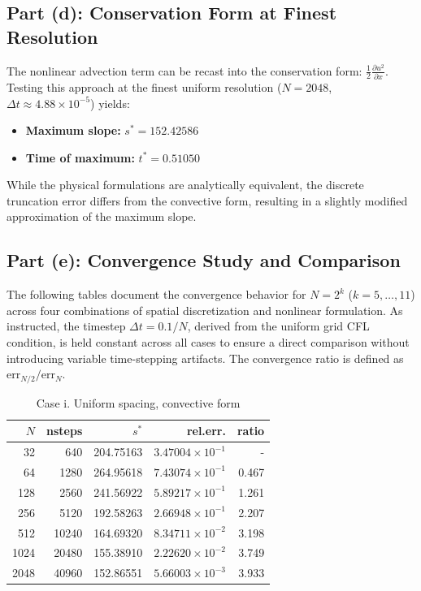 \documentclass[11pt]{article}
\begin{document}
\subsection*{Part (d): Conservation Form at Finest Resolution}
The nonlinear advection term can be recast into the conservation form: $\frac{1}{2}\frac{\partial u^2}{\partial x}$. Testing this approach at the finest uniform resolution ($N=2048$, $\Delta t \approx 4.88 \times 10^{-5}$) yields:
\begin{itemize}
    \item \textbf{Maximum slope:} $s^* = 152.42586$
    \item \textbf{Time of maximum:} $t^* = 0.51050$
\end{itemize}
While the physical formulations are analytically equivalent, the discrete truncation error differs from the convective form, resulting in a slightly modified approximation of the maximum slope.

\subsection*{Part (e): Convergence Study and Comparison}

The following tables document the convergence behavior for $N=2^k$ ($k=5, \dots, 11$) across four combinations of spatial discretization and nonlinear formulation. As instructed, the timestep $\Delta t = 0.1/N$, derived from the uniform grid CFL condition, is held constant across all cases to ensure a direct comparison without introducing variable time-stepping artifacts. The convergence ratio is defined as $\text{err}_{N/2}/\text{err}_{N}$.

\begin{table}[H]
\centering
\caption{Case i. Uniform spacing, convective form}
\begin{tabular}{@{}rrrrr@{}}
\toprule
$N$ & nsteps & $s^*$ & rel.err. & ratio \\
\midrule
  32 &   640 & 204.75163 & $3.47004 \times 10^{-1}$ & - \\
  64 &  1280 & 264.95618 & $7.43074 \times 10^{-1}$ & 0.467 \\
 128 &  2560 & 241.56922 & $5.89217 \times 10^{-1}$ & 1.261 \\
 256 &  5120 & 192.58263 & $2.66948 \times 10^{-1}$ & 2.207 \\
 512 & 10240 & 164.69320 & $8.34711 \times 10^{-2}$ & 3.198 \\
1024 & 20480 & 155.38910 & $2.22620 \times 10^{-2}$ & 3.749 \\
2048 & 40960 & 152.86551 & $5.66003 \times 10^{-3}$ & 3.933 \\
\bottomrule
\end{tabular}
\end{table}
\end{document}
